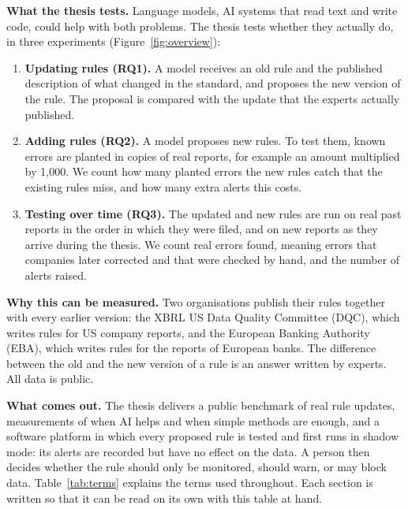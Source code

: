 \documentclass[11pt,a4paper]{article}
\begin{document}
\textbf{What the thesis tests.} Language models, AI systems that read text and write code, could help with both problems. The thesis tests whether they actually do, in three experiments (Figure~\ref{fig:overview}):
\begin{enumerate}
\item \textbf{Updating rules (RQ1).} A model receives an old rule and the published description of what changed in the standard, and proposes the new version of the rule. The proposal is compared with the update that the experts actually published.
\item \textbf{Adding rules (RQ2).} A model proposes new rules. To test them, known errors are planted in copies of real reports, for example an amount multiplied by 1,000. We count how many planted errors the new rules catch that the existing rules miss, and how many extra alerts this costs.
\item \textbf{Testing over time (RQ3).} The updated and new rules are run on real past reports in the order in which they were filed, and on new reports as they arrive during the thesis. We count real errors found, meaning errors that companies later corrected and that were checked by hand, and the number of alerts raised.
\end{enumerate}

\textbf{Why this can be measured.} Two organisations publish their rules together with every earlier version: the XBRL US Data Quality Committee (DQC), which writes rules for US company reports, and the European Banking Authority (EBA), which writes rules for the reports of European banks. The difference between the old and the new version of a rule is an answer written by experts. All data is public.

\textbf{What comes out.} The thesis delivers a public benchmark of real rule updates, measurements of when AI helps and when simple methods are enough, and a software platform in which every proposed rule is tested and first runs in shadow mode: its alerts are recorded but have no effect on the data. A person then decides whether the rule should only be monitored, should warn, or may block data. Table~\ref{tab:terms} explains the terms used throughout. Each section is written so that it can be read on its own with this table at hand.
\end{document}
